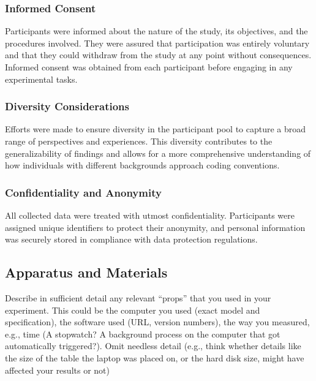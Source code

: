 \documentclass{article}
\begin{document}
\subsubsection*{Informed Consent}

Participants were informed about the nature of the study, its objectives, and the procedures involved. They were assured that participation was entirely voluntary and that they could withdraw from the study at any point without consequences. Informed consent was obtained from each participant before engaging in any experimental tasks.

\subsubsection*{Diversity Considerations}

Efforts were made to ensure diversity in the participant pool to capture a broad range of perspectives and experiences. This diversity contributes to the generalizability of findings and allows for a more comprehensive understanding of how individuals with different backgrounds approach coding conventions.

\subsubsection*{Confidentiality and Anonymity}

All collected data were treated with utmost confidentiality. Participants were assigned unique identifiers to protect their anonymity, and personal information was securely stored in compliance with data protection regulations.

\subsection{Apparatus and Materials}
Describe in sufficient detail any relevant “props” that you used in your experiment. This could be the computer
you used (exact model and specification), the software used (URL, version numbers), the way you measured, e.g.,
time (A stopwatch? A background process on the computer that got automatically triggered?). Omit needless
detail (e.g., think whether details like the size of the table the laptop was placed on, or the hard disk size, might
have affected your results or not)
\end{document}
